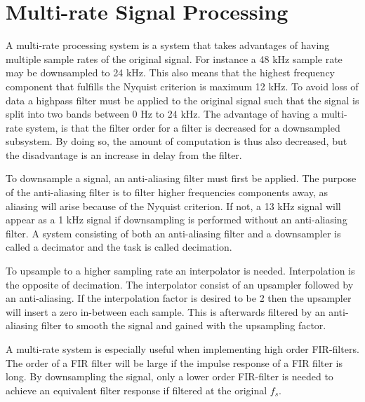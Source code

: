 \section{Multi-rate Signal Processing}

A multi-rate processing system is a system that takes advantages of having multiple sample rates of the original signal. For instance a 48 kHz sample rate may be downsampled to 24 kHz. This also means that the highest frequency component that fulfills the Nyquist criterion is maximum 12 kHz. To avoid loss of data a highpass filter must be applied to the original signal such that the signal is split into two bands between 0 Hz to 24 kHz. The advantage of having a multi-rate system, is that the filter order for a filter is decreased for a downsampled subsystem. By doing so, the amount of computation is thus also decreased, but the disadvantage is an increase in delay from the filter. 

To downsample a signal, an anti-aliasing filter must first be applied. The purpose of the anti-aliasing filter is to filter higher frequencies components away, as aliasing will arise because of the Nyquist criterion. If not, a 13 kHz signal will appear as a 1 kHz signal if downsampling is performed without an anti-aliasing filter. A system consisting of both an anti-aliasing filter and a downsampler is called a decimator and the task is called decimation.

To upsample to a higher sampling rate an interpolator is needed. Interpolation is the opposite of decimation. The interpolator consist of an upsampler followed by an anti-aliasing. If the interpolation factor is desired to be 2 then the upsampler will insert a zero in-between each sample. This is afterwards filtered by an anti-aliasing filter to smooth the signal and gained with the upsampling factor.  

A multi-rate system is especially useful when implementing high order FIR-filters. The order of a FIR filter will be large if the impulse response of a FIR filter is long. By downsampling the signal, only a lower order FIR-filter is needed to achieve an equivalent filter response if filtered at the original $f_s$.




